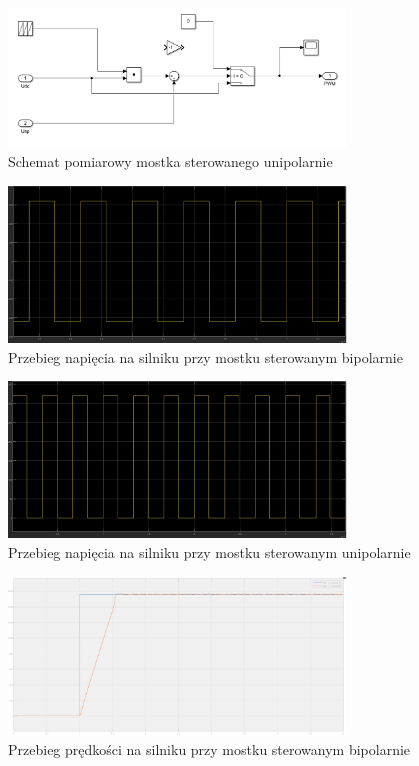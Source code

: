 \documentclass[11pt]{article}
\begin{document}
\begin{figure}[H]
\centering
\includegraphics[width=0.8\textwidth]{aun1_unipolar_schematic.png}
\caption{Schemat pomiarowy mostka sterowanego unipolarnie}
\end{figure}

\begin{figure}[H]
\centering
\includegraphics[width=0.8\textwidth]{aun1_bipolar_bridge_voltage.png}
\caption{Przebieg napięcia na silniku przy mostku sterowanym bipolarnie}
\end{figure}

\begin{figure}[H]
\centering
\includegraphics[width=0.8\textwidth]{aun1_unipolar_bridge_voltage.png}
\caption{Przebieg napięcia na silniku przy mostku sterowanym unipolarnie}
\end{figure}

\begin{figure}[H]
\centering
\includegraphics[width=0.8\textwidth]{aun1_bipolar_bridge.png}
\caption{Przebieg prędkości na silniku przy mostku sterowanym bipolarnie}
\end{figure}
\end{document}
